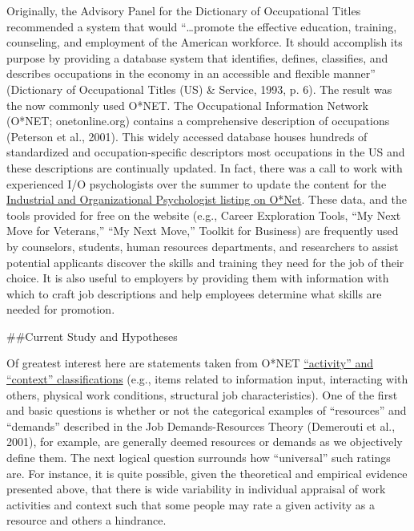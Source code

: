 \documentclass[
  english,
  man]{apa6}
\begin{document}
Originally, the Advisory Panel for the Dictionary of Occupational Titles recommended a system that would ``\ldots promote the effective education, training, counseling, and employment of the American workforce. It should accomplish its purpose by providing a database system that identifies, defines, classifies, and describes occupations in the economy in an accessible and flexible manner'' (Dictionary of Occupational Titles (US) \& Service, 1993, p. 6). The result was the now commonly used O*NET. The Occupational Information Network (O*NET; onetonline.org) contains a comprehensive description of occupations (Peterson et al., 2001). This widely accessed database houses hundreds of standardized and occupation-specific descriptors most occupations in the US and these descriptions are continually updated. In fact, there was a call to work with experienced I/O psychologists over the summer to update the content for the \href{https://www.onetonline.org/link/summary/19-3032.00}{Industrial and Organizational Psychologist listing on O*Net}. These data, and the tools provided for free on the website (e.g., Career Exploration Tools, ``My Next Move for Veterans,'' ``My Next Move,'' Toolkit for Business) are frequently used by counselors, students, human resources departments, and researchers to assist potential applicants discover the skills and training they need for the job of their choice. It is also useful to employers by providing them with information with which to craft job descriptions and help employees determine what skills are needed for promotion.

\#\#Current Study and Hypotheses

Of greatest interest here are statements taken from O*NET \href{https://www.O*NETonline.org/find/descriptor/result/4.A.1.b.3}{``activity'' and ``context'' classifications} (e.g., items related to information input, interacting with others, physical work conditions, structural job characteristics). One of the first and basic questions is whether or not the categorical examples of ``resources'' and ``demands'' described in the Job Demands-Resources Theory (Demerouti et al., 2001), for example, are generally deemed resources or demands as we objectively define them. The next logical question surrounds how ``universal'' such ratings are. For instance, it is quite possible, given the theoretical and empirical evidence presented above, that there is wide variability in individual appraisal of work activities and context such that some people may rate a given activity as a resource and others a hindrance.
\end{document}
